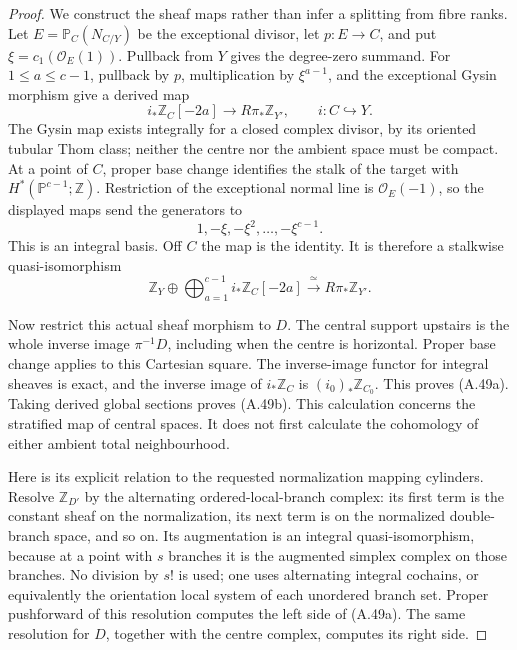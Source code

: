 \begin{proof}
We construct the sheaf maps rather than infer a
splitting from fibre ranks. Let $E=\mathbb P_C(N_{C/Y})$
be the exceptional divisor, let $p:E\to C$, and put
$\xi=c_1(\mathcal O_E(1))$. Pullback from $Y$ gives
the degree-zero summand. For $1\leq a\leq c-1$,
pullback by $p$, multiplication by $\xi^{a-1}$,
and the exceptional Gysin morphism give a derived
map
\[
 i_*\mathbb Z_C[-2a]\longrightarrow
 R\pi_*\mathbb Z_{Y'},\qquad i:C\hookrightarrow Y.
\]
The Gysin map exists integrally for a closed complex
divisor, by its oriented tubular Thom class; neither
the centre nor the ambient space must be compact.
At a point of $C$, proper base change identifies
the stalk of the target with
$H^*(\mathbb P^{c-1};\mathbb Z)$.
Restriction of the exceptional normal line is
$\mathcal O_E(-1)$, so the displayed maps send
the generators to
\[
 1,-\xi,-\xi^2,\ldots,-\xi^{c-1}.
\]
This is an integral basis. Off $C$ the map is
the identity. It is therefore a stalkwise
quasi-isomorphism
\[
 \mathbb Z_Y\oplus
 \bigoplus_{a=1}^{c-1}i_*\mathbb Z_C[-2a]
 \xrightarrow{\ \simeq\ }R\pi_*\mathbb Z_{Y'}.
\]

Now restrict this actual sheaf morphism to $D$.
The central support upstairs is the whole inverse
image $\pi^{-1}D$, including when the centre is
horizontal. Proper base change applies to this
Cartesian square. The inverse-image functor for
integral sheaves is exact, and the inverse image
of $i_*\mathbb Z_C$ is
$(i_0)_*\mathbb Z_{C_0}$. This proves (A.49a).
Taking derived global sections proves (A.49b).
This calculation concerns the stratified map of
central spaces. It does not first calculate the
cohomology of either ambient total neighbourhood.

Here is its explicit relation to the requested
normalization mapping cylinders. Resolve
$\mathbb Z_{D'}$ by the alternating ordered-local-branch
complex: its first term is the constant sheaf on
the normalization, its next term is on the normalized
double-branch space, and so on. Its augmentation is
an integral quasi-isomorphism, because at a point
with $s$ branches it is the augmented simplex
complex on those branches. No division by $s!$ is
used; one uses alternating integral cochains, or
equivalently the orientation local system of each
unordered branch set. Proper pushforward of this
resolution computes the left side of (A.49a).
The same resolution for $D$, together with the
centre complex, computes its right side.


\end{proof}

